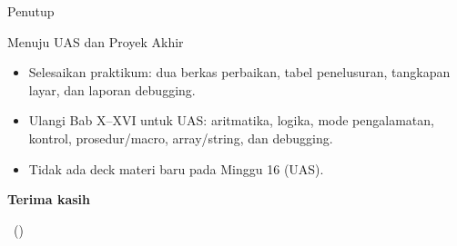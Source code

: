 \documentclass[aspectratio=169,11pt]{beamer}
\begin{document}
\begin{frame}{Penutup}
\begin{block}{Menuju UAS dan Proyek Akhir}
\small
\begin{itemize}
    \item Selesaikan praktikum: dua berkas perbaikan, tabel
          penelusuran, tangkapan layar, dan laporan debugging.
    \item Ulangi Bab X--XVI untuk UAS: aritmatika, logika, mode
          pengalamatan, kontrol, prosedur/macro, array/string, dan
          debugging.
    \item Tidak ada deck materi baru pada Minggu 16 (UAS).
\end{itemize}
\end{block}

\vspace{0.4em}
\begin{center}
{\color{obeBlue}\sffamily\large\bfseries Terima kasih\par}
\vspace{0.15em}
{\color{obeGray}\sffamily\small \NamaMK\ (\KodeMK)
\textbullet\ \SemesterTeks\par}
\end{center}
\end{frame}
\end{document}

